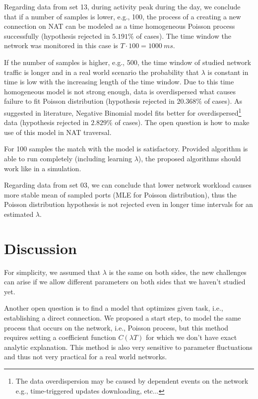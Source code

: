 \documentclass{llncs}
\begin{document}
Regarding data from set 13, during activity peak during the day, we conclude that if a number of samples 
is lower, e.g., 100, the process of a creating a new connection on NAT can 
be modeled as a time homogeneous Poisson process successfully (hypothesis rejected in $5.191\%$ of cases).
The time window the network was monitored in this case is $T \cdot 100 = 1000~ms$. 

If the number of samples is higher, e.g., 500, the time window of studied network traffic is longer and
in a real world scenario the probability that $\lambda$ is constant in time is low with the increasing length of the time
window. Due to this time homogeneous model is not strong enough, data is 
overdispersed what causes failure to fit Poisson distribution (hypothesis rejected in $20.368\%$ of cases). As suggested
in literature, Negative Binomial model fits better for overdispersed\footnote{The data overdispersion may be caused by dependent events on the network e.g., time-triggered updates downloading, etc...}
data (hypothesis rejected in $2.829\%$ of cases). 
The open question is how to make use of this model in NAT traversal.

For 100 samples the match with the model is satisfactory. Provided algorithm is able to run completely (including learning $\lambda$),
the proposed algorithms should work like in a simulation.

Regarding data from set 03, we can conclude that lower network workload causes more stable mean of sampled ports (MLE for Poisson distribution),
thus the Poisson distribution hypothesis is not rejected even in longer time intervals for an estimated $\lambda$. 


\section{Discussion}
For simplicity, we assumed that $\lambda$ is the same on both sides, the new challenges 
can arise if we allow different parameters on both sides that we haven't studied yet.

Another open question is to find a model that optimizes given task, i.e., establishing a direct
connection. We proposed a start step, to model the same process that occurs on the network, i.e.,
Poisson process, but this method requires setting a coefficient function $C(\lambda T)$ for which 
we don't have exact analytic explanation. This method is also very sensitive to parameter fluctuations
and thus not very practical for a real world networks. 
\end{document}
